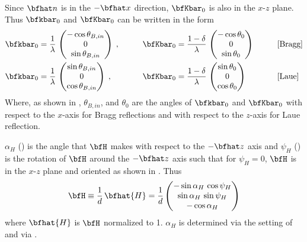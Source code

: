 Since $\bfhat n$ is in the $-\bfhat x$ direction, $\bfKbar_0$ is also
in the $x$-$z$ plane. Thus $\bfkbar_0$ and $\bfKbar_0$ can be written
in the form
\begin{alignat}{3}
  \bfkbar_0 &= \frac{1}{\lambda} \, 
    \begin{pmatrix}
    -\cos\theta_{B,in} \\
    0 \\
    \sin\theta_{B,in}
    \end{pmatrix}
  \; , & \qquad
  \bfKbar_0 &= \frac{1 - \delta}{\lambda} \, 
    \begin{pmatrix}
    -\cos\theta_0 \\
    0 \\
    \sin\theta_0
    \end{pmatrix}
  & \qquad &\text{[Bragg]} \CRNO
  \bfkbar_0 &= \frac{1}{\lambda} \, 
    \begin{pmatrix}
    \sin\theta_{B,in} \\
    0 \\
    \cos\theta_{B,in}
    \end{pmatrix}
  \; , & \qquad
  \bfKbar_0 &= \frac{1 - \delta}{\lambda} \, 
    \begin{pmatrix}
    \sin\theta_0 \\
    0 \\
    \cos\theta_0
    \end{pmatrix}
  &\qquad & \text{[Laue]} 
  \label{k1lst}
\end{alignat}
Where, as shown in , $\theta_{B,in}$, and
$\theta_0$ are the angles of $\bfkbar_0$ and $\bfKbar_0$ with respect
to the $x$-axis for Bragg reflections and with respect to the $z$-axis
for Laue reflection. 

$\alpha_H$ () is the angle that $\bfH$ makes with
respect to the $-\bfhat z$ axis and $\psi_H$ () is the
rotation of $\bfH$ around the $-\bfhat z$ axis such that for $\psi_H =
0$, $\bfH$ is in the $x$-$z$ plane and oriented as shown in
. Thus
\begin{equation}
  \bfH 
  \equiv \frac{1}{d} \, \bfhat{H} 
  = \frac{1}{d}
    \begin{pmatrix} 
       -\sin \alpha_H \, \cos \psi_H \\ \sin \alpha_H \, \sin \psi_H \\ -\cos \alpha_H
    \end{pmatrix}
  \label{h1daa}
\end{equation}
where $\bfhat{H}$ is $\bfH$ normalized to 1. $\alpha_H$ is determined
via the setting of  and via .

